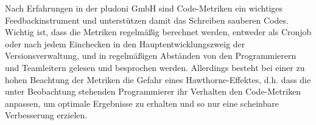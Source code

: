  Nach Erfahrungen in der pludoni GmbH sind Code-Metriken ein wichtiges Feedbackinstrument und unterstützen damit das Schreiben sauberen Codes. Wichtig ist, dass die Metriken regelmäßig berechnet werden, entweder als Cronjob oder nach jedem Einchecken in den Hauptentwicklungszweig der Versionsverwaltung, und in regelmäßigen Abständen von den Programmierern und Teamleitern gelesen und besprochen werden. Allerdings besteht bei einer zu hohen Beachtung der Metriken die Gefahr eines Hawthorne-Effektes, d.h. dass die unter Beobachtung stehenden Programmierer ihr Verhalten den Code-Metriken anpassen, um optimale Ergebnisse zu erhalten \citep[52. Karte]{langr_agile_2011} und so nur eine scheinbare Verbesserung erzielen.
